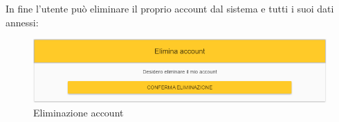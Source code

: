 In fine l'utente può eliminare il proprio account dal sistema e tutti i suoi dati annessi:

\label{EliminaAccount}
\begin{figure}[ht]
	\centering
	\includegraphics[scale=0.45]{img/elimina_account.png}
	\caption{Eliminazione account}
\end{figure}
\FloatBarrier